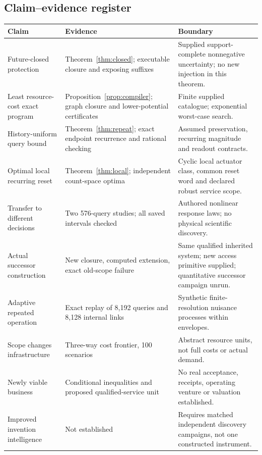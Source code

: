 \documentclass[11pt,letterpaper]{article}
\theoremstyle{definition}\newtheorem{definition}[theorem]{Definition}
\theoremstyle{remark}\newtheorem{remark}[theorem]{Remark}
\begin{document}
\subsection{Claim--evidence register}
\begingroup\small
\begin{longtable}{P{4cm}P{5.5cm}P{6cm}}
\toprule
Claim & Evidence & Boundary\\
\midrule\endhead
Future-closed protection & Theorem~\ref{thm:closed}; executable closure and exposing suffixes & Supplied support-complete nonnegative uncertainty; no new injection in this theorem.\\
Least resource-cost exact program & Proposition~\ref{prop:compiler}; graph closure and lower-potential certificates & Finite supplied catalogue; exponential worst-case search.\\
History-uniform query bound & Theorem~\ref{thm:repeat}; exact endpoint recurrence and rational checking & Assumed preservation, recurring magnitude and readout contracts.\\
Optimal local recurring reset & Theorem~\ref{thm:local}; independent count-space optima & Cyclic local actuator class, common reset word and declared robust service scope.\\
Transfer to different decisions & Two 576-query studies; all saved intervals checked & Authored nonlinear response laws; no physical scientific discovery.\\
Actual successor construction & New closure, computed extension, exact old-scope failure & Same qualified inherited system; new access primitive supplied; quantitative successor campaign unrun.\\
Adaptive repeated operation & Exact replay of 8,192 queries and 8,128 internal links & Synthetic finite-resolution nuisance processes within envelopes.\\
Scope changes infrastructure & Three-way cost frontier, 100 scenarios & Abstract resource units, not full costs or actual demand.\\
Newly viable business & Conditional inequalities and proposed qualified-service unit & No real acceptance, receipts, operating venture or valuation established.\\
Improved invention intelligence & Not established & Requires matched independent discovery campaigns, not one constructed instrument.\\
\bottomrule
\end{longtable}
\endgroup
\end{document}

